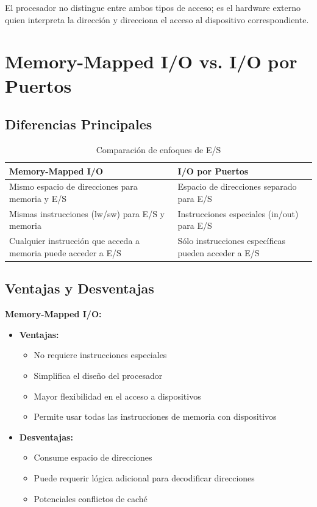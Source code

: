 \documentclass[12pt,a4paper]{article}
\begin{document}
El procesador no distingue entre ambos tipos de acceso; es el hardware externo quien interpreta la dirección y direcciona el acceso al dispositivo correspondiente.

\section{Memory-Mapped I/O vs. I/O por Puertos}

\subsection{Diferencias Principales}
\begin{table}[h]
\centering
\begin{tabular}{|p{5cm}|p{5cm}|}
\hline
\textbf{Memory-Mapped I/O} & \textbf{I/O por Puertos} \\
\hline
Mismo espacio de direcciones para memoria y E/S & Espacio de direcciones separado para E/S \\
\hline
Mismas instrucciones (lw/sw) para E/S y memoria & Instrucciones especiales (in/out) para E/S \\
\hline
Cualquier instrucción que acceda a memoria puede acceder a E/S & Sólo instrucciones específicas pueden acceder a E/S \\
\hline
\end{tabular}
\caption{Comparación de enfoques de E/S}
\end{table}

\subsection{Ventajas y Desventajas}

\textbf{Memory-Mapped I/O:}
\begin{itemize}
    \item \textbf{Ventajas:}
    \begin{itemize}
        \item No requiere instrucciones especiales
        \item Simplifica el diseño del procesador
        \item Mayor flexibilidad en el acceso a dispositivos
        \item Permite usar todas las instrucciones de memoria con dispositivos
    \end{itemize}
    \item \textbf{Desventajas:}
    \begin{itemize}
        \item Consume espacio de direcciones
        \item Puede requerir lógica adicional para decodificar direcciones
        \item Potenciales conflictos de caché
    \end{itemize}
\end{itemize}
\end{document}
